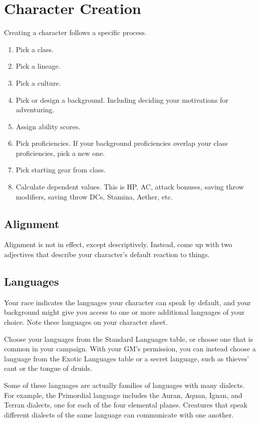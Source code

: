 \chapter{Character Creation}
\label{ch:character-creation}
Creating a character follows a specific process.
\begin{enumerate}
    \item Pick a class.
    \item Pick a lineage.
    \item Pick a culture.
    \item Pick or design a background. Including deciding your motivations for adventuring.
    \item Assign ability scores.
    \item Pick proficiencies. If your background proficiencies overlap your class proficiencies, pick a new one.
    \item Pick starting gear from class.
    \item Calculate dependent values. This is HP, AC, attack bonuses, saving throw modifiers, saving throw DCs, Stamina, Aether, etc.
\end{enumerate}
\section{Alignment}
\label{sec:alignment}
Alignment is not in effect, except descriptively. Instead, come up with two adjectives that describe your character's default reaction to things. 

\section{Languages}
\label{sec:languages}
Your race indicates the languages your character can speak by default, and your background might give you access to one or more additional languages of your choice. Note these languages on your character sheet.

Choose your languages from the Standard Languages table, or choose one that is common in your campaign. With your GM's permission, you can instead choose a language from the Exotic Languages table or a secret language, such as thieves' cant or the tongue of druids.

Some of these languages are actually families of languages with many dialects. For example, the Primordial language includes the Auran, Aquan, Ignan, and Terran dialects, one for each of the four elemental planes. Creatures that speak different dialects of the same language can communicate with one another.

